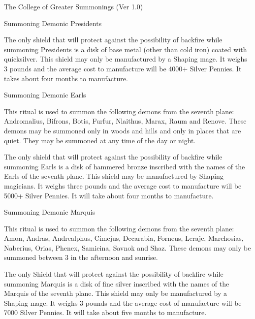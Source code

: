 \begin{Chapter}{The College of Greater Summonings (Ver 1.0)}
\begin{ritual}[R-3]{Summoning Demonic Presidents}
\begin{effects}
The only shield that will protect against the possibility of backfire
while summoning Presidents is a disk of base metal (other than cold
iron) coated with quicksilver. This shield may only be manufactured by
a Shaping mage.  It weighs 3 pounds and the average cost to
manufacture will be 4000+ Silver Pennies. It takes about four months
to manufacture.
\end{effects}
\end{ritual}

\begin{ritual}[R-4]{Summoning Demonic Earls}

\begin{effects}
This ritual is used to summon the following demons from the seventh
plane: Andromalius, Bifrons, Botis, Furfur, Nlaithus, Marax, Raum and
Renove. These demons may be summoned only in woods and hills and only
in places that are quiet.  They may be summoned at any time of the day
or night.

The only shield that will protect against the possibility of
backfire while summoning Earls is a disk of hammered bronze inscribed
with the names of the Earls of the seventh plane. This shield may be
manufactured by Shaping magicians.  It weighs three pounds and the
average cost to manufacture will be 5000+ Silver Pennies.  It will
take about four months to manufacture.
\end{effects}
\end{ritual}

\begin{ritual}[R-5]{Summoning Demonic Marquis}

\begin{effects}
This ritual is used to summon the following demons from the seventh
plane: Amon, Andras, Andrealphus, Cimejus, Decarabia, Forneus,
Leraje, Marchosias, Naberius, Orias, Phenex, Samieina, Savnok and
Shaz.  These demons may only be summoned between 3 in the afternoon
and sunrise.

The only Shield that will protect against the possibility of backfire
while summoning Marquis is a disk of fine silver inscribed with the
names of the Marquis of the seventh plane. This shield may only be
manufactured by a Shaping mage.  It weighs 3 pounds and the average
cost of manufacture will be 7000 Silver Pennies. It will take about
five months to manufacture.

\end{effects}
\end{ritual}


\end{Chapter}
